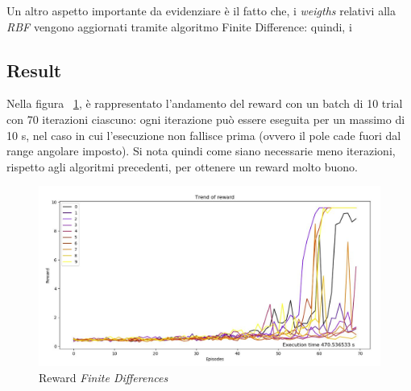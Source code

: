 Un altro aspetto importante da evidenziare è il fatto che, i \textit{weigths} relativi alla \textit{RBF} vengono aggiornati tramite algoritmo Finite Difference: quindi, i

\subsection{Result}
Nella figura ~\ref{fig:Reward_FD}, è rappresentato l'andamento del reward con un batch di 10 trial con 70 iterazioni ciascuno: ogni iterazione può essere eseguita per un massimo di 10 s, nel caso in cui l'esecuzione non fallisce prima (ovvero il pole cade fuori dal range angolare imposto).
Si nota quindi come siano necessarie meno iterazioni, rispetto agli algoritmi precedenti, per ottenere un reward molto buono.

\begin{figure}[!h]
	\centering
	\includegraphics[width=\textwidth]{Immagini/Reward_FD.JPG}
	\caption{Reward \textit{Finite Differences}}
	\label{fig:Reward_FD}
\end{figure}

\newpage